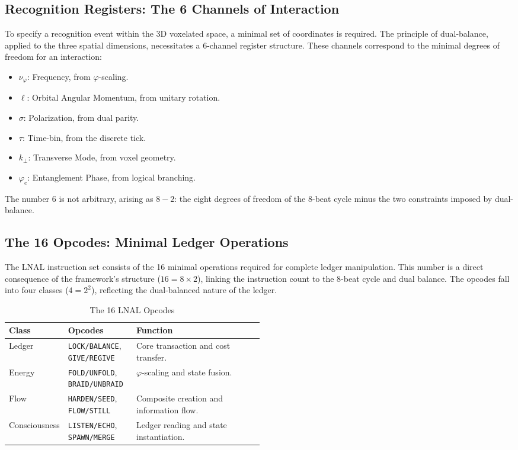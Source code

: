 \subsection{Recognition Registers: The 6 Channels of Interaction}
To specify a recognition event within the 3D voxelated space, a minimal set of coordinates is required. The principle of dual-balance, applied to the three spatial dimensions, necessitates a 6-channel register structure. These channels correspond to the minimal degrees of freedom for an interaction:
\begin{itemize}
    \item \(\nu_\varphi\): Frequency, from \(\varphi\)-scaling.
    \item \(\ell\): Orbital Angular Momentum, from unitary rotation.
    \item \(\sigma\): Polarization, from dual parity.
    \item \(\tau\): Time-bin, from the discrete tick.
    \item \(k_\perp\): Transverse Mode, from voxel geometry.
    \item \(\varphi_e\): Entanglement Phase, from logical branching.
\end{itemize}
The number 6 is not arbitrary, arising as \(8-2\): the eight degrees of freedom of the 8-beat cycle minus the two constraints imposed by dual-balance.

\subsection{The 16 Opcodes: Minimal Ledger Operations}
The LNAL instruction set consists of the 16 minimal operations required for complete ledger manipulation. This number is a direct consequence of the framework's structure (\(16 = 8 \times 2\)), linking the instruction count to the 8-beat cycle and dual balance. The opcodes fall into four classes (\(4=2^2\)), reflecting the dual-balanced nature of the ledger.

\begin{table}[h!]
\centering
\caption{The 16 LNAL Opcodes}
\label{tab:opcodes}
\begin{tabular}{llp{0.5\linewidth}}
\toprule
\textbf{Class} & \textbf{Opcodes} & \textbf{Function} \\
\midrule
Ledger & \texttt{LOCK/BALANCE}, \texttt{GIVE/REGIVE} & Core transaction and cost transfer. \\
Energy & \texttt{FOLD/UNFOLD}, \texttt{BRAID/UNBRAID} & \(\varphi\)-scaling and state fusion. \\
Flow & \texttt{HARDEN/SEED}, \texttt{FLOW/STILL} & Composite creation and information flow. \\
Consciousness & \texttt{LISTEN/ECHO}, \texttt{SPAWN/MERGE} & Ledger reading and state instantiation. \\
\bottomrule
\end{tabular}
\end{table}

